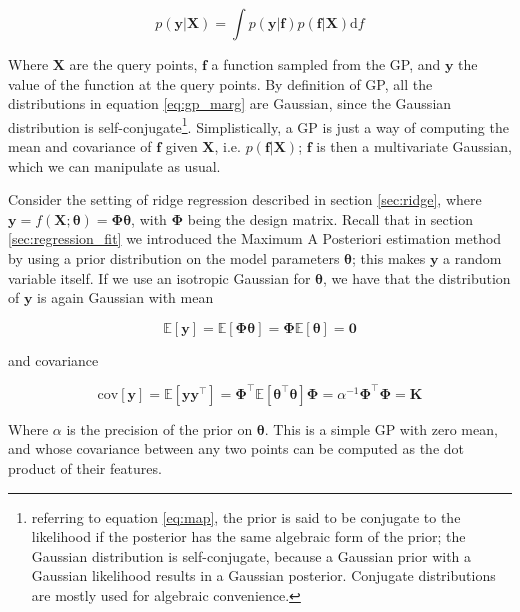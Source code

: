 \documentclass[a4paper]{book}
\begin{document}
\begin{equation}
\label{eq:gp_marg}
p(\bm y\vert\bm X)=\int p(\bm y\vert \bm f)p(\bm f\vert\bm X)\text{d}f
\end{equation}

Where $\bm X$ are the query points, $\bm f$ a function sampled from the GP, and $\bm y$ the value of the function at the query points. By definition of GP, all the distributions in equation \ref{eq:gp_marg} are Gaussian, since the Gaussian distribution is self-conjugate\footnote{referring to equation \ref{eq:map}, the prior is said to be conjugate to the likelihood if the posterior has the same algebraic form of the prior; the Gaussian distribution is self-conjugate, because a Gaussian prior with a Gaussian likelihood results in a Gaussian posterior. Conjugate distributions are mostly used for algebraic convenience.}. Simplistically, a GP is just a way of computing the mean and covariance of $\bm f$ given $\bm X$, i.e. $p(\bm f\vert\bm X)$; $\bm f$ is then a multivariate Gaussian, which we can manipulate as usual.

Consider the setting of ridge regression described in section \ref{sec:ridge}, where $\bm y=f(\bm X;\bm\theta)=\bm\Phi\bm\theta$, with $\bm\Phi$ being the design matrix. Recall that in section \ref{sec:regression_fit} we introduced the Maximum A Posteriori estimation method by using a prior distribution on the model parameters $\bm\theta$; this makes $\bm y$ a random variable itself. If we use an isotropic Gaussian for $\bm\theta$, we have that the distribution of $\bm y$ is again Gaussian with mean

\begin{equation}
\mathbb{E}[\bm y]=\mathbb{E}[\bm\Phi\bm\theta]=\bm\Phi\mathbb{E}[\bm\theta]=\bm 0
\end{equation}

\noindent and covariance

\begin{equation}
\text{cov}[\bm y]=\mathbb{E}[\bm y\bm y^\intercal]
=\bm\Phi^\intercal\mathbb{E}[\bm\theta^\intercal\bm\theta]\bm\Phi
=\alpha^{-1}\bm\Phi^\intercal\bm\Phi=\bm K
\end{equation}

Where $\alpha$ is the precision of the prior on $\bm\theta$. This is a simple GP with zero mean, and whose covariance between any two points can be computed as the dot product of their features.
\end{document}
